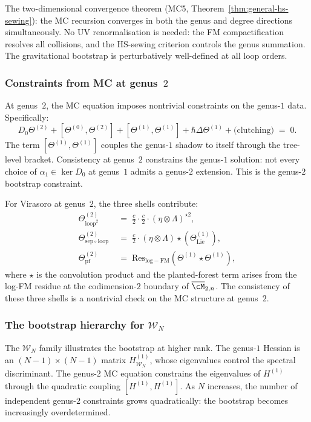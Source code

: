 The two-dimensional convergence theorem
(MC5, Theorem~\ref{thm:general-hs-sewing}):
the MC recursion converges in both the genus and degree
directions simultaneously. No UV renormalisation is needed:
the FM compactification resolves all collisions, and the
HS-sewing criterion controls the genus summation. The
gravitational bootstrap is perturbatively well-defined at all
loop orders.

\subsubsection*{Constraints from MC at genus~$2$}

At genus~$2$, the MC equation imposes nontrivial constraints
on the genus-$1$ data. Specifically:
\[
D_0\Theta^{(2)}
+[\Theta^{(0)},\Theta^{(2)}]+[\Theta^{(1)},\Theta^{(1)}]
+\hbar\Delta\Theta^{(1)}
+\text{(clutching)}
\;=\;0.
\]
The term $[\Theta^{(1)},\Theta^{(1)}]$ couples the genus-$1$
shadow to itself through the tree-level bracket. Consistency
at genus~$2$ constrains the genus-$1$ solution: not every
choice of $\alpha_1\in\ker D_0$ at genus~$1$ admits a genus-$2$
extension. This is the genus-$2$ bootstrap constraint.

For Virasoro at genus~$2$, the three shells contribute:
\begin{align*}
\Theta^{(2)}_{\mathrm{loop}^2}
&\;=\;\frac{c}{2}\cdot\frac{c}{2}\cdot
 (\eta\otimes\Lambda)^{\star 2},\\[4pt]
\Theta^{(2)}_{\mathrm{sep}\circ\mathrm{loop}}
&\;=\;\frac{c}{2}\cdot
 (\eta\otimes\Lambda)\star(\Theta^{(1)}_{\mathrm{Lie}}),\\[4pt]
\Theta^{(2)}_{\mathrm{pf}}
&\;=\;
 \mathrm{Res}_{\mathrm{log-FM}}(\Theta^{(1)}\star\Theta^{(1)}),
\end{align*}
where $\star$ is the convolution product and the planted-forest
term arises from the log-FM residue at the codimension-$2$
boundary of $\overline{\cM}_{2,n}$. The consistency
of these three shells is a nontrivial check on the MC structure
at genus~$2$.

\subsubsection*{The bootstrap hierarchy for $\mathcal W_N$}

The $\mathcal W_N$ family illustrates the bootstrap at higher rank.
The genus-$1$ Hessian is an $(N-1)\times(N-1)$ matrix
$H^{(1)}_{\mathcal W_N}$, whose eigenvalues control the spectral
discriminant. The genus-$2$ MC equation constrains the eigenvalues
of $H^{(1)}$ through the quadratic coupling
$[H^{(1)},H^{(1)}]$. As $N$ increases, the number of independent
genus-$2$ constraints grows quadratically: the bootstrap becomes
increasingly overdetermined.


